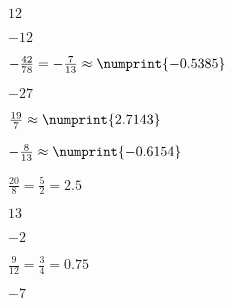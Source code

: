{{\item$12$  \item$-12$  \item$-\frac{42}{78} = -\frac{7}{13} \approx \numprint{-0.5385}$
\item$-27$  \item$\frac{19}{7} \approx \numprint{2.7143}$  \item$-\frac{8}{13} \approx \numprint{-0.6154}$
\item$\frac{20}{8} = \frac{5}{2} = 2.5$  \item$13$  \item$-2$
\item$\frac{9}{12} = \frac{3}{4} = 0.75$  \item$-7$  }}